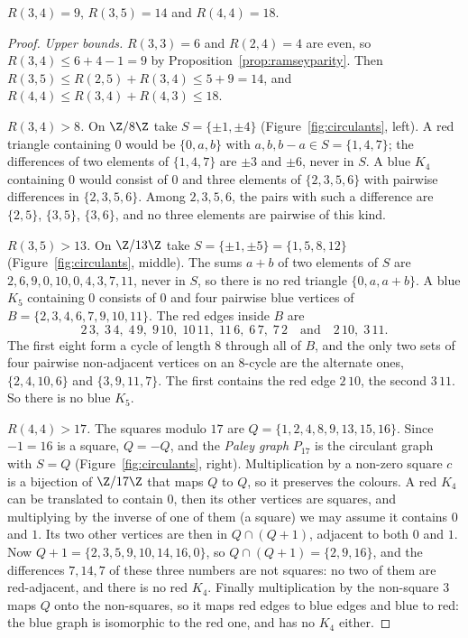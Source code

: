 \begin{theorem}\label{thm:smallramsey}
$R(3,4)=9$, $R(3,5)=14$ and $R(4,4)=18$.
\end{theorem}
\begin{proof}
\emph{Upper bounds.} $R(3,3)=6$ and $R(2,4)=4$ are even, so $R(3,4)\le6+4-1=9$ by Proposition~\ref{prop:ramseyparity}. Then $R(3,5)\le R(2,5)+R(3,4)\le5+9=14$, and
$R(4,4)\le R(3,4)+R(4,3)\le18$.

\emph{$R(3,4)>8$.} On $\Z/8\Z$ take $S=\{\pm1,\pm4\}$ (Figure~\ref{fig:circulants}, left). A red triangle containing $0$ would be $\{0,a,b\}$ with $a,b,b-a\in S=\{1,4,7\}$; the
differences of two elements of $\{1,4,7\}$ are $\pm3$ and $\pm6$, never in $S$. A blue $K_4$ containing $0$ would consist of $0$ and three elements of $\{2,3,5,6\}$ with
pairwise differences in $\{2,3,5,6\}$. Among $2,3,5,6$, the pairs with such a difference are $\{2,5\}$, $\{3,5\}$, $\{3,6\}$, and no three elements are pairwise of this kind.

\emph{$R(3,5)>13$.} On $\Z/13\Z$ take $S=\{\pm1,\pm5\}=\{1,5,8,12\}$ (Figure~\ref{fig:circulants}, middle). The sums $a+b$ of two elements of $S$ are $2,6,9,0,10,0,4,3,7,11$, never in
$S$, so there is no red triangle $\{0,a,a+b\}$. A blue $K_5$ containing $0$ consists of $0$ and four pairwise blue vertices of $B=\{2,3,4,6,7,9,10,11\}$. The red edges
inside $B$ are
\[
2\,3,\;3\,4,\;4\,9,\;9\,10,\;10\,11,\;11\,6,\;6\,7,\;7\,2\quad\text{and}\quad2\,10,\;3\,11.
\]
The first eight form a cycle of length $8$ through all of $B$, and the only two sets of four pairwise non-adjacent vertices on an $8$-cycle are the alternate
ones, $\{2,4,10,6\}$ and $\{3,9,11,7\}$. The first contains the red edge $2\,10$, the second $3\,11$. So there is no blue $K_5$.

\emph{$R(4,4)>17$.} The squares modulo $17$ are $Q=\{1,2,4,8,9,13,15,16\}$. Since $-1=16$ is a square, $Q=-Q$, and the \emph{Paley graph} $P_{17}$ is the circulant graph
with $S=Q$ (Figure~\ref{fig:circulants}, right). Multiplication by a non-zero square $c$ is a bijection of $\Z/17\Z$ that maps $Q$ to $Q$, so it preserves the colours. A red $K_4$ can be
translated to contain $0$, then its other vertices are squares, and multiplying by the inverse of one of them (a square) we may assume it contains $0$ and $1$. Its
two other vertices are then in $Q\cap(Q+1)$, adjacent to both $0$ and $1$. Now $Q+1=\{2,3,5,9,10,14,16,0\}$, so $Q\cap(Q+1)=\{2,9,16\}$, and the differences $7,14,7$ of these
three numbers are not squares: no two of them are red-adjacent, and there is no red $K_4$. Finally multiplication by the non-square $3$ maps $Q$ onto the non-squares, so it
maps red edges to blue edges and blue to red: the blue graph is isomorphic to the red one, and has no $K_4$ either.
\end{proof}

